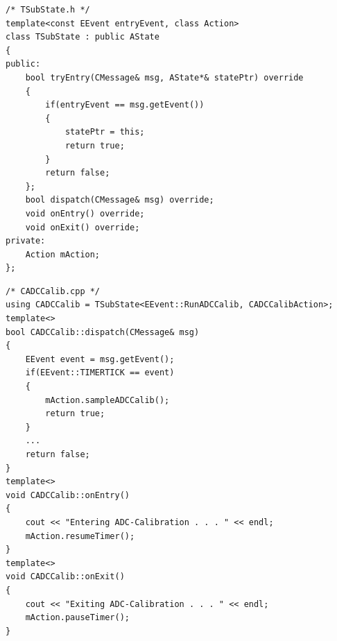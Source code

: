\begin{lstlisting}[caption={Templateklasse für einfache Versuchszustände},captionpos=b]
/* TSubState.h */
template<const EEvent entryEvent, class Action>
class TSubState : public AState
{
public:
	bool tryEntry(CMessage& msg, AState*& statePtr) override
	{
		if(entryEvent == msg.getEvent())
		{
			statePtr = this;
			return true;
		}
		return false;
	};
	bool dispatch(CMessage& msg) override;
	void onEntry() override;
	void onExit() override;
private:
	Action mAction;
};
\end{lstlisting}

\begin{lstlisting}[caption={Beispielhafte Instantiierung des Versuchstemplate},captionpos=b]
/* CADCCalib.cpp */
using CADCCalib = TSubState<EEvent::RunADCCalib, CADCCalibAction>;
template<>
bool CADCCalib::dispatch(CMessage& msg)
{
	EEvent event = msg.getEvent();
	if(EEvent::TIMERTICK == event)
	{
		mAction.sampleADCCalib();
		return true;
	}
	...
	return false;
}
template<>
void CADCCalib::onEntry()
{
	cout << "Entering ADC-Calibration . . . " << endl;
	mAction.resumeTimer();
}
template<>
void CADCCalib::onExit()
{
	cout << "Exiting ADC-Calibration . . . " << endl;
	mAction.pauseTimer();
}
\end{lstlisting}